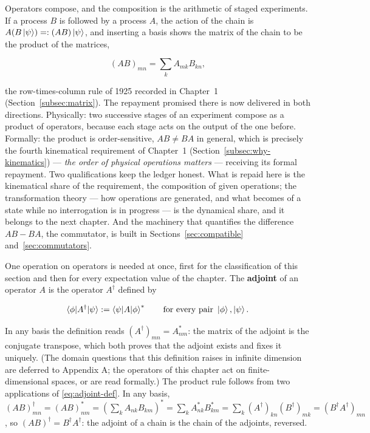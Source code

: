 Operators compose, and the composition is the arithmetic of staged experiments. If a process $B$ is followed by a process $A$, the action of the chain is $A(B\ket{\psi}) =: (AB)\ket{\psi}$, and inserting a basis shows the matrix of the chain to be the product of the matrices,
\begin{linenomath}
    \begin{equation}
        (AB)_{mn} = \sum_k A_{mk}B_{kn},
        \label{eq:operator-product}
    \end{equation}
\end{linenomath}
the row-times-column rule of 1925 recorded in Chapter~1 (Section~\ref{subsec:matrix}). The repayment promised there is now delivered in both directions. Physically: two successive stages of an experiment compose as a product of operators, because each stage acts on the output of the one before. Formally: the product is order-sensitive, $AB \neq BA$ in general, which is precisely the fourth kinematical requirement of Chapter~1 (Section~\ref{subsec:why-kinematics}) --- \emph{the order of physical operations matters} --- receiving its formal repayment. Two qualifications keep the ledger honest. What is repaid here is the kinematical share of the requirement, the composition of given operations; the transformation theory --- how operations are generated, and what becomes of a state while no interrogation is in progress --- is the dynamical share, and it belongs to the next chapter. And the machinery that quantifies the difference $AB - BA$, the commutator, is built in Sections~\ref{sec:compatible} and~\ref{sec:commutators}.

One operation on operators is needed at once, first for the classification of this section and then for every expectation value of the chapter. The \textbf{adjoint} of an operator $A$ is the operator $A^\dagger$ defined by
\begin{linenomath}
    \begin{equation}
        \braket{\phi|A^\dagger|\psi} := \braket{\psi|A|\phi}^{*}
        \qquad\text{for every pair }\ket{\phi},\ket{\psi}.
        \label{eq:adjoint-def}
    \end{equation}
\end{linenomath}
In any basis the definition reads $(A^\dagger)_{mn} = A_{nm}^{*}$: the matrix of the adjoint is the conjugate transpose, which both proves that the adjoint exists and fixes it uniquely. (The domain questions that this definition raises in infinite dimension are deferred to Appendix A; the operators of this chapter act on finite-dimensional spaces, or are read formally.) The product rule follows from two applications of \eqref{eq:adjoint-def}. In any basis, $(AB)^\dagger_{mn}=(AB)^*_{nm}=(\sum_k A_{nk}B_{km})^*=\sum_k A^*_{nk}B^*_{km}=\sum_k (A^\dagger)_{kn}(B^\dagger)_{mk}=(B^\dagger A^\dagger)_{mn}$, so $(AB)^\dagger = B^\dagger A^\dagger$: the adjoint of a chain is the chain of the adjoints, reversed.

